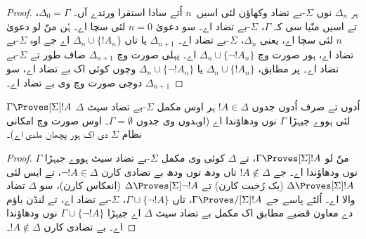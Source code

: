\documentclass[../../../include/open-logic-section]{subfiles}
\begin{document}
\begin{proof}
ہر $\Delta_n$ نوں $\Sigma$-بے تضاد وکھاؤن لئی اسیں~$n$ اُتے سادا استقرا ورتدے آں۔ $\Delta_0 = \Gamma$، تے اسیں منّیا سی کہ $\Gamma$،
$\Sigma$-بے تضاد اے۔ سو دعویٰ $n = 0$ لئی سچا اے۔ ہُن منّ لو دعویٰ
$n$ لئی سچا اے، یعنی $\Delta_n$، $\Sigma$-بے تضاد اے۔ $\Delta_{n+1}$ یا تاں
$\Delta_n \cup \{!A_n\}$ اے جے اوہ $\Sigma$-بے تضاد اے، ہور صورت وچ $\Delta_n \cup \{\lnot!A_n\}$ اے۔ پہلی صورت وچ
$\Delta_{n+1}$ صاف طور تے $\Sigma$-بے تضاد اے۔ پر
 مطابق،
$\Delta_n \cup \{!A_n\}$ یا $\Delta_n \cup \{\lnot!A_n\}$ وچوں کوئی اک بے تضاد اے، سو $\Delta_{n+1}$ دوجی صورت وچ وی بے تضاد اے۔
\end{proof}

\begin{cor}
  $\Gamma \Proves[\Sigma] !A$ اُدوں تے صرف اُدوں جدوں $!A \in \Delta$ ہر اوس مکمل $\Sigma$-بے تضاد سیٹ $\Delta$ لئی ہووے جیہڑا $\Gamma$ نوں ودھاؤندا اے (اوہدوں وی جدوں $\Gamma = \emptyset$۔ اوس صورت وچ امکانی نظام $\Sigma$ دی اک ہور پچھان ملدی اے)۔
\end{cor}

\begin{proof}
  منّ لو $\Gamma \Proves[\Sigma] !A$، تے $\Delta$ کوئی وی مکمل $\Sigma$-بے تضاد سیٹ ہووے جیہڑا $\Gamma$ نوں ودھاؤندا اے۔ جے $!A
  \notin \Delta$ تاں ودھ توں ودھ بے تضادی کارن $\lnot!A \in \Delta$، تے ایس لئی
  $\Delta \Proves[\Sigma] !A$ (یک رُخیت کارن) تے $\Delta
  \Proves[\Sigma] \lnot!A$ (انعکاس کارن)، سو $\Delta$ تضاد والا اے۔ اُلٹے پاسے جے $\Gamma \Proves/[\Sigma] !A$، تاں
  $\Gamma \cup \{ \lnot!A \}$، $\Sigma$-بے تضاد اے، تے لنڈن باؤم دے معاون قضیے مطابق اک مکمل بے تضاد سیٹ $\Delta$ اے جیہڑا $\Gamma \cup \{ \lnot!A \}$ نوں ودھاؤندا اے۔ بے تضادی کارن $!A
  \notin \Delta$۔
\end{proof}
\end{document}
